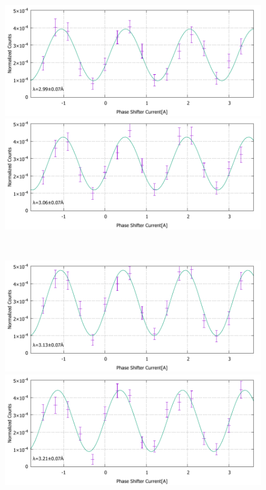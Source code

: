 \begin{figure}[h]
\begin{minipage}{0.5\hsize}
\includegraphics[width=\hsize]{discussion/IF_nb/Interference_nb_fit420.pdf}
\end{minipage}
\begin{minipage}{0.5\hsize}
\includegraphics[width=\hsize]{discussion/IF_nb/Interference_nb_fit430.pdf}
\end{minipage}\\
\begin{minipage}{0.5\hsize}
\includegraphics[width=\hsize]{discussion/IF_nb/Interference_nb_fit440.pdf}
\end{minipage}
\begin{minipage}{0.5\hsize}
\includegraphics[width=\hsize]{discussion/IF_nb/Interference_nb_fit450.pdf}

\end{minipage}
\end{figure}
